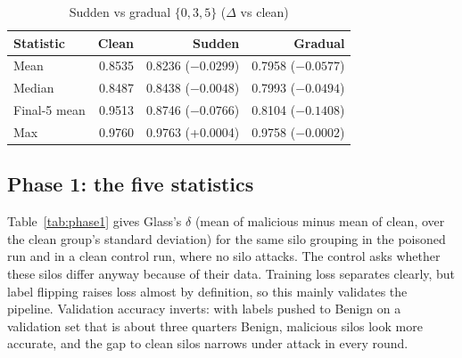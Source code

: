 \begin{table}[h]
\centering
\caption{Sudden vs gradual $\{0,3,5\}$ ($\Delta$ vs clean)} %
\label{tab:gradual}
\footnotesize
\begin{tabular}{@{}lrrr@{}}
\toprule
Statistic & Clean & Sudden & Gradual\\
\midrule
Mean & 0.8535 & 0.8236 ($-0.0299$) & 0.7958 ($-0.0577$)\\ %
Median & 0.8487 & 0.8438 ($-0.0048$) & 0.7993 ($-0.0494$)\\ %
Final-5 mean & 0.9513 & 0.8746 ($-0.0766$) & 0.8104 ($-0.1408$)\\ %
Max & 0.9760 & 0.9763 (+0.0004) & 0.9758 ($-0.0002$)\\ %
\bottomrule
\end{tabular}
\end{table}

\subsection{Phase 1: the five statistics}
Table~\ref{tab:phase1} gives Glass's $\delta$ (mean of malicious minus mean of clean,
over the clean group's standard deviation) for the same silo grouping in the poisoned
run and in a clean control run, where no silo attacks. The control asks whether these
silos differ anyway because of their data. Training loss separates clearly, but label
flipping raises loss almost by definition, so this mainly validates the pipeline.
Validation accuracy inverts: with labels pushed to Benign on a validation set that is
about three quarters Benign, malicious silos look more accurate, and the gap to clean
silos narrows under attack in every round.


